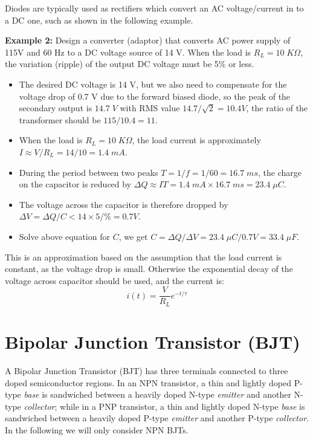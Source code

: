 Diodes are typically used as rectifiers which convert an AC voltage/current
in to a DC one, such as shown in the following example.

{\bf Example 2: } Design a converter (adaptor) that converts AC power 
supply of 115V and 60 Hz to a DC voltage source of 14 V. When the load is
$R_L=10\;K\Omega$, the variation (ripple) of the output DC voltage must 
be 5\% or less.



\begin{itemize}
\item The desired DC voltage is 14 V, but we also need to compensate for the
  voltage drop of 0.7 V due to the forward biased diode, so the  peak of the
  secondary output is $14.7\;V$ with RMS value $14.7/\sqrt{2}=10.4V$, the ratio
  of the transformer should be $115/10.4=11$. 
\item When the load is $R_L=10\;K\Omega$, the load current is approximately
  $I\approx V/R_L=14/10=1.4\;mA$.
\item During the period between two peaks $T=1/f=1/60=16.7\;ms$, the charge 
	on the capacitor is reduced by $\Delta Q\approx IT=1.4\;mA\times 
        16.7\;ms=23.4\;\mu C$. 	
\item The voltage across the capacitor is therefore dropped by
	$\Delta V=\Delta Q/C < 14\times 5/\%=0.7V $. 
\item Solve above equation for $C$, we get $C=\Delta Q/\Delta V
  =23.4\;\mu C/0.7V=33.4\;\mu F$.
\end{itemize}
This is an approximation based on the assumption that the load current is
constant, as the voltage drop is small. Otherwise the exponential decay of
the voltage across capacitor should be used, and the current is:
\[	i(t)=\frac{V}{R_L} e^{-t/\tau}	\]

\section*{Bipolar Junction Transistor (BJT)} 

A Bipolar Junction Transistor (BJT) has three terminals connected to three
doped semiconductor regions. In an NPN transistor, a thin and lightly doped 
P-type {\em base} is sandwiched between a heavily doped N-type {\em emitter}
and another N-type {\em collector}; while in a PNP transistor, a thin and 
lightly doped N-type {\em base} is sandwiched between a heavily doped P-type
{\em emitter} and another P-type {\em collector}. In the following we will 
only consider NPN BJTs.

